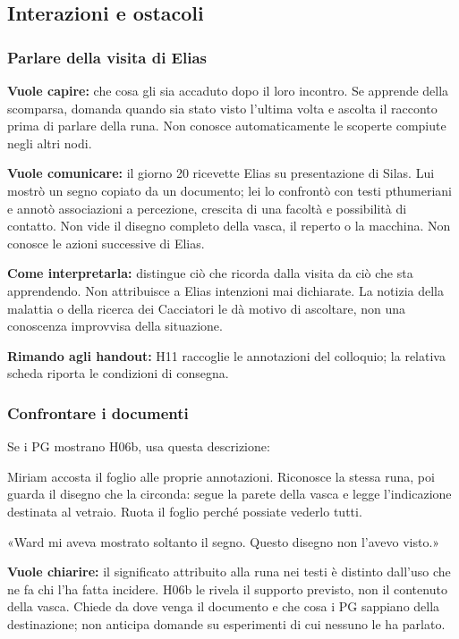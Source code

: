\documentclass[11pt,a4paper]{article}
\begin{document}
\subsection{Interazioni e ostacoli}
\subsubsection{Parlare della visita di Elias}
\textbf{Vuole capire:} che cosa gli sia accaduto dopo il loro incontro. Se apprende della scomparsa, domanda quando sia stato visto l'ultima volta e ascolta il racconto prima di parlare della runa. Non conosce automaticamente le scoperte compiute negli altri nodi.

\textbf{Vuole comunicare:} il giorno 20 ricevette Elias su presentazione di Silas. Lui mostrò un segno copiato da un documento; lei lo confrontò con testi pthumeriani e annotò associazioni a percezione, crescita di una facoltà e possibilità di contatto. Non vide il disegno completo della vasca, il reperto o la macchina. Non conosce le azioni successive di Elias.



\textbf{Come interpretarla:} distingue ciò che ricorda dalla visita da ciò che sta apprendendo. Non attribuisce a Elias intenzioni mai dichiarate. La notizia della malattia o della ricerca dei Cacciatori le dà motivo di ascoltare, non una conoscenza improvvisa della situazione.

\textbf{Rimando agli handout:} H11 raccoglie le annotazioni del colloquio; la relativa scheda riporta le condizioni di consegna.

\subsubsection{Confrontare i documenti}
Se i PG mostrano H06b, usa questa descrizione:
\begin{readaloud}
Miriam accosta il foglio alle proprie annotazioni. Riconosce la stessa runa, poi guarda il disegno che la circonda: segue la parete della vasca e legge l'indicazione destinata al vetraio. Ruota il foglio perché possiate vederlo tutti.

«Ward mi aveva mostrato soltanto il segno. Questo disegno non l'avevo visto.»
\end{readaloud}

\textbf{Vuole chiarire:} il significato attribuito alla runa nei testi è distinto dall'uso che ne fa chi l'ha fatta incidere. H06b le rivela il supporto previsto, non il contenuto della vasca. Chiede da dove venga il documento e che cosa i PG sappiano della destinazione; non anticipa domande su esperimenti di cui nessuno le ha parlato.
\end{document}
